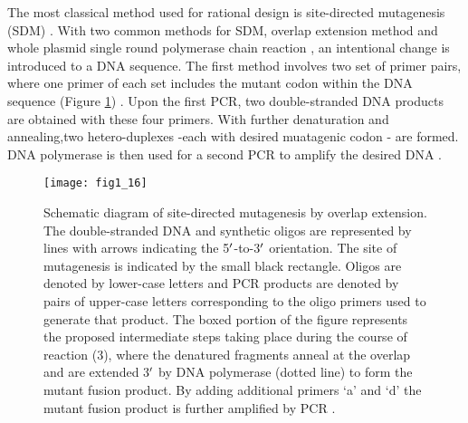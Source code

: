\begin{refsection}
The most classical method used for rational design
is site-directed mutagenesis (SDM) \cite{Arnold1993}. With two common methods
for SDM, overlap extension method \cite{Ho1989} and whole plasmid single round
polymerase chain reaction \cite{Antikainen2005a}, an intentional change is
introduced to a DNA sequence. The first method involves two set of primer
pairs, where one primer of each set includes the mutant codon within the DNA
sequence (Figure \ref{fig:sdm-1}) \cite{Ho1989}. Upon the first PCR, two
double-stranded DNA products are obtained with these four primers. With further
denaturation and annealing,two hetero-duplexes -each with desired muatagenic
codon - are formed.  DNA polymerase is then used for a second PCR to amplify
the desired DNA \cite{Ho1989}. 
\begin{figure}[htbp] \centering \texttt{[image: fig1\_16]}
    \caption[Schematic diagram of site-directed mutagenesis by overlap
        extension. The double-stranded DNA and synthetic oligos are represented
        by lines with arrows indicating the 5$\rq$-to-3$\rq$ orientation. The site of
        mutagenesis is indicated by the small black rectangle. Oligos are
        denoted by lower-case letters and PCR products are denoted by pairs of
        upper-case letters corresponding to the oligo primers used to generate
        that product. The boxed portion of the figure represents the proposed
        intermediate steps taking place during the course of reaction (3),
        where the denatured fragments anneal at the overlap and are extended 3’
        by DNA polymerase (dotted line) to form the mutant fusion product. By
        adding additional primers ‘a’ and ‘d’ the mutant fusion product is
        further amplified by PCR.]
        {Schematic diagram of site-directed mutagenesis by overlap extension.
            The double-stranded DNA and synthetic oligos are represented by lines
            with arrows indicating the 5$\rq$-to-3$\rq$ orientation. The site of
            mutagenesis is indicated by the small black rectangle. Oligos are
            denoted by lower-case letters and PCR products are denoted by pairs
            of upper-case letters corresponding to the oligo primers used to
            generate that product. The boxed portion of the figure represents
            the proposed intermediate steps taking place during the course of
            reaction (3), where the denatured fragments anneal at the overlap
            and are extended 3$\rq$ by DNA polymerase (dotted line) to form the
            mutant fusion product. By adding additional primers ‘a’ and ‘d’ the
            mutant fusion product is further amplified by PCR \cite{Ho1989}.}
            \label{fig:sdm-1} 
\end{figure}


\end{refsection}
